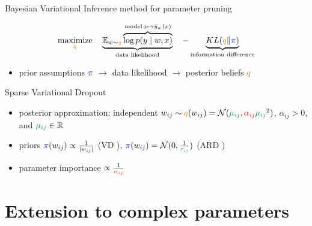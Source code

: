 \documentclass{beamer}
\newcommand{\real}{\mathbb{R}}
\begin{document}
\begin{frame}[c]{\insertsubsection}{\insertsection}
  Bayesian Variational Inference method for parameter pruning \citep{kingma_variational_2015}

  \medskip
  $$
    \underset{
      {\color{orange} q}
    }{\text{maximize}}
    \quad
    \underbrace{
      \mathbb{E}_{w \sim {\color{orange} q}}
        \overbrace{
          \log p(y\mid w, x)  %
        }^{
          \text{model}
          \,
          x\mapsto \hat{y}_w(x)
        }
    }_{
      \text{data likelihood}
    }
    \quad
    - \underbrace{
      KL({\color{orange} q}\|{\color{blue} \pi})
    }_{
      \text{information difference}
    }
    $$
  \medskip
  \begin{itemize}
    \item prior assumptions ${\color{blue} \pi}$
      $\to$ data likelihood
      $\to$ posterior beliefs ${\color{orange} q}$
  \end{itemize}

  \bigskip
  Sparse Variational Dropout
  \begin{itemize}
    \item posterior approximation: independent $
      w_{ij} \sim {\color{orange} q}(w_{ij})
        = \mathcal{N}(
          {\color{teal} \mu_{ij}},
          {\color{red} \alpha_{ij}}
            {\color{teal} \mu_{ij}}^2
        )
    $, $\alpha_{ij} > 0$, and ${\color{teal} \mu_{ij}} \in \real$
    \smallskip
    \item priors $
        {\color{blue} \pi}(w_{ij})
          \propto \frac1{\lvert w_{ij}\rvert}
      $ (VD \citep{molchanov_variational_2017}), $
        {\color{blue} \pi}(w_{ij}) = \mathcal{N}(
          0, \tfrac1{{\color{teal} \tau_{ij}}}
        )
      $ (ARD \citep{kharitonov_variational_2018})

    \item parameter importance $\propto \frac1{{\color{red} \alpha_{ij}}}$
  \end{itemize}

\end{frame}



\section{Extension to complex parameters} %
\label{sec:extension_to_complex_parameters}
\end{document}
